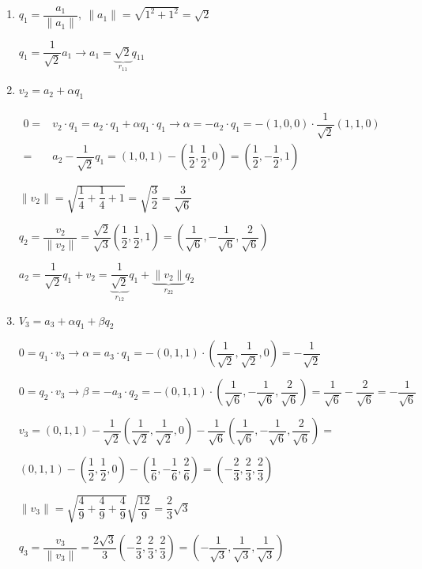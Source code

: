 \documentclass[12pt]{article}
\begin{document}
\begin{enumerate}[label=\arabic*)]
\item $q_1=\dfrac{a_1}{\|a_1\|},~\|a_1\|=\sqrt{1^2+1^2}=\sqrt{2}$

$q_1=\dfrac{1}{\sqrt{2}}a_1\longrightarrow a_1=\underbrace{\sqrt{2}}_{r_{11}}q_{11}$

\item $v_2=a_2+\alpha q_1$

$\begin{array}{rl}
0= & v_2\cdot q_1=a_2\cdot q_1+\alpha q_1\cdot q_1\longrightarrow\alpha=-a_2\cdot q_1=-(1,0,0)\cdot\dfrac{1}{\sqrt{2}}(1,1,0)\\
=& a_2-\dfrac{1}{\sqrt{2}}q_1=(1,0,1)-\left(\dfrac{1}{2},\dfrac{1}{2},0\right)=\left(\dfrac{1}{2},-\dfrac{1}{2},1\right)
\end{array}$

$\|v_2\|=\sqrt{\dfrac{1}{4}+\dfrac{1}{4}+1}=\sqrt{\dfrac{3}{2}}=\dfrac{3}{\sqrt{6}}$

$q_2=\dfrac{v_2}{\|v_2\|}=\dfrac{\sqrt{2}}{\sqrt{3}}\left(\dfrac{1}{2},\dfrac{1}{2},1\right)=\left(\dfrac{1}{\sqrt{6}},-\dfrac{1}{\sqrt{6}},\dfrac{2}{\sqrt{6}}\right)$

$a_2=\dfrac{1}{\sqrt{2}}q_1+v_2=\underbrace{\dfrac{1}{\sqrt{2}}}_{r_{12}}q_1+\underbrace{\|v_2\|}_{r_{22}}q_2$

\item $V_3=a_3+\alpha q_1+\beta q_2$

$0=q_1\cdot v_3\longrightarrow\alpha=a_3\cdot q_1=-(0,1,1)\cdot\left(\dfrac{1}{\sqrt{2}},\dfrac{1}{\sqrt{2}},0\right)=-\dfrac{1}{\sqrt{2}}$

$0=q_2\cdot v_3\longrightarrow\beta=-a_3\cdot q_2=-(0,1,1)\cdot\left(\dfrac{1}{\sqrt{6}},-\dfrac{1}{\sqrt{6}},\dfrac{2}{\sqrt{6}}\right)=\dfrac{1}{\sqrt{6}}-\dfrac{2}{\sqrt{6}}=-\dfrac{1}{\sqrt{6}}$

$v_3=(0,1,1)-\dfrac{1}{\sqrt{2}}\left(\dfrac{1}{\sqrt{2}},\dfrac{1}{\sqrt{2}},0\right)-\dfrac{1}{\sqrt{6}}\left(\dfrac{1}{\sqrt{6}},-\dfrac{1}{\sqrt{6}},\dfrac{2}{\sqrt{6}}\right)=$

$(0,1,1)-\left(\dfrac{1}{2},\dfrac{1}{2},0\right)-\left(\dfrac{1}{6},-\dfrac{1}{6},\dfrac{2}{6}\right)=\left(-\dfrac{2}{3},\dfrac{2}{3},\dfrac{2}{3}\right)$

$\|v_3\|=\sqrt{\dfrac{4}{9}+\dfrac{4}{9}+\dfrac{4}{9}}\sqrt{\dfrac{12}{9}}=\dfrac{2}{3}\sqrt{3}$

$q_3=\dfrac{v_3}{\|v_3\|}=\dfrac{2\sqrt{3}}{3}\left(-\dfrac{2}{3},\dfrac{2}{3},\dfrac{2}{3}\right)=\left(-\dfrac{1}{\sqrt{3}},\dfrac{1}{\sqrt{3}},\dfrac{1}{\sqrt{3}}\right)$

\end{enumerate}
\end{document}
